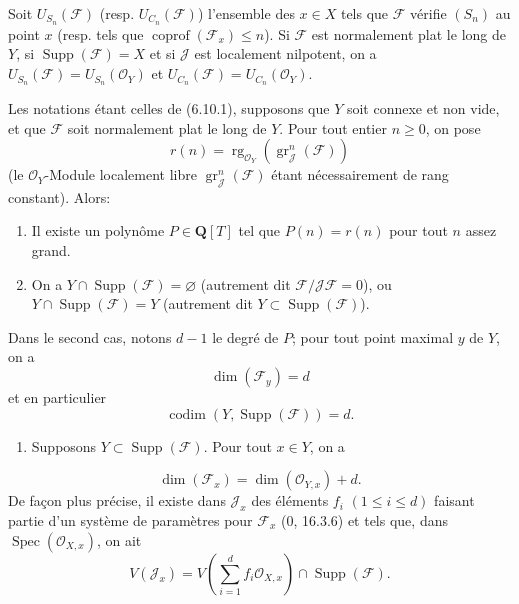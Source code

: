 \begin{corollary}[6.10.4]
\label{IV.2.s6.10.4-fr}
Soit $U_{S_n}(\mathcal F)$ (resp. $U_{C_n}(\mathcal F)$) l'ensemble des
$x\in X$ tels que $\mathcal F$ vérifie $(S_n)$ au point $x$ (resp. tels que
$\operatorname{coprof}(\mathcal F_x)\leq n$). Si $\mathcal F$ est normalement
plat le long de $Y$, si $\operatorname{Supp}(\mathcal F)=X$ et si $\mathcal J$
est localement nilpotent, on a
$U_{S_n}(\mathcal F)=U_{S_n}(\mathcal O_Y)$ et
$U_{C_n}(\mathcal F)=U_{C_n}(\mathcal O_Y)$.
\end{corollary}

\begin{proposition}[6.10.5]
\label{IV.2.s6.10.5-fr}
Les notations étant celles de (6.10.1), supposons que $Y$ soit connexe et non
vide, et que $\mathcal F$ soit normalement plat le long de $Y$. Pour tout
entier $n\geq0$, on pose
\begin{equation}
r(n)=\operatorname{rg}_{\mathcal O_Y}
(\operatorname{gr}_{\mathcal J}^{n}(\mathcal F))
\tag{6.10.5.1}\label{IV.2.s6.10.5.1-fr}
\end{equation}
(le $\mathcal O_Y$-Module localement libre
$\operatorname{gr}_{\mathcal J}^{n}(\mathcal F)$ étant nécessairement de rang
constant). Alors:
\begin{enumerate}
\item[(i)] Il existe un polynôme $P\in\mathbf Q[T]$ tel que $P(n)=r(n)$ pour
tout $n$ assez grand.
\item[(ii)] On a $Y\cap\operatorname{Supp}(\mathcal F)=\varnothing$
(autrement dit $\mathcal F/\mathcal J\mathcal F=0$), ou
$Y\cap\operatorname{Supp}(\mathcal F)=Y$ (autrement dit
$Y\subset\operatorname{Supp}(\mathcal F)$).
\end{enumerate}
Dans le second cas, notons $d-1$ le degré de $P$; pour tout point maximal $y$
de $Y$, on a
\begin{equation}
\dim(\mathcal F_y)=d
\tag{6.10.5.2}\label{IV.2.s6.10.5.2-fr}
\end{equation}
et en particulier
\begin{equation}
\operatorname{codim}(Y,\operatorname{Supp}(\mathcal F))=d.
\tag{6.10.5.3}\label{IV.2.s6.10.5.3-fr}
\end{equation}
\begin{enumerate}
\item[(iii)] Supposons $Y\subset\operatorname{Supp}(\mathcal F)$. Pour tout
$x\in Y$, on a
\end{enumerate}
\begin{equation}
\dim(\mathcal F_x)=\dim(\mathcal O_{Y,x})+d.
\tag{6.10.5.4}\label{IV.2.s6.10.5.4-fr}
\end{equation}
De façon plus précise, il existe dans $\mathcal J_x$ des éléments $f_i$
$(1\leq i\leq d)$ faisant partie d'un système de paramètres pour
$\mathcal F_x$ (0, 16.3.6) et tels que, dans
$\operatorname{Spec}(\mathcal O_{X,x})$, on ait
\[
V(\mathcal J_x)=V\left(\sum_{i=1}^{d}f_i\mathcal O_{X,x}\right)
\cap\operatorname{Supp}(\mathcal F).
\]
\end{proposition}

